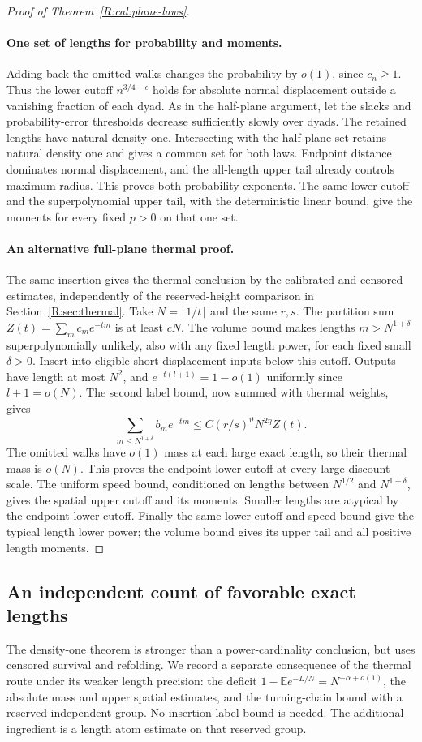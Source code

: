 \begin{proof}[Proof of Theorem~\ref{R:cal:plane-laws}]
\paragraph{One set of lengths for probability and moments.}
Adding back the omitted walks changes the probability by $o(1)$,
since $c_n\ge1$. Thus the lower cutoff $n^{3/4-\epsilon}$ holds for
absolute normal displacement outside a vanishing fraction of each
dyad. As in the half-plane argument, let the slacks and probability-error
thresholds decrease sufficiently slowly over dyads. The retained lengths
have natural density one. Intersecting with the half-plane set retains
natural density one and gives a common set for both laws. Endpoint
distance dominates normal displacement,
and the all-length upper tail already controls maximum radius. This
proves both probability exponents. The same lower cutoff and the
superpolynomial upper tail, with the deterministic linear bound, give
the moments for every fixed $p>0$ on that one set.

\paragraph{An alternative full-plane thermal proof.}
The same insertion gives the thermal conclusion by the calibrated and
censored estimates, independently of the reserved-height comparison in
Section~\ref{R:sec:thermal}. Take $N=\lceil1/t\rceil$ and the same
$r,s$. The partition sum $Z(t)=\sum_m c_me^{-tm}$ is at least $cN$.
The volume bound makes lengths $m>N^{1+\delta}$ superpolynomially
unlikely, also with any fixed length power, for each fixed small
$\delta>0$. Insert into eligible short-displacement inputs below this
cutoff. Outputs have length at most $N^2$, and
$e^{-t(l+1)}=1-o(1)$ uniformly since $l+1=o(N)$. The second label
bound, now summed with thermal weights, gives
\[
 \sum_{m\le N^{1+\delta}}b_me^{-tm}
 \le C(r/s)^\vartheta N^{2\eta}Z(t).
\]
The omitted walks have $o(1)$ mass at each large exact length, so their
thermal mass is $o(N)$. This proves the endpoint lower cutoff at every
large discount scale. The uniform speed bound, conditioned on lengths
between $N^{1/2}$ and $N^{1+\delta}$, gives the spatial upper cutoff
and its moments. Smaller lengths are atypical by the endpoint lower
cutoff. Finally the same lower cutoff and speed bound give the typical
length lower power; the volume bound gives its upper tail and all
positive length moments.
\end{proof}

\subsection{An independent count of favorable exact lengths}
\label{R:cal:good-lengths}
The density-one theorem is stronger than a power-cardinality conclusion,
but uses censored survival and refolding. We record a separate consequence
of the thermal route under its weaker length precision: the deficit
$1-\mathbb E e^{-L/N}=N^{-\alpha+o(1)}$, the absolute mass and upper
spatial estimates, and the turning-chain bound with a reserved independent
group. No insertion-label bound is needed. The additional ingredient is a
length atom estimate on that reserved group.

